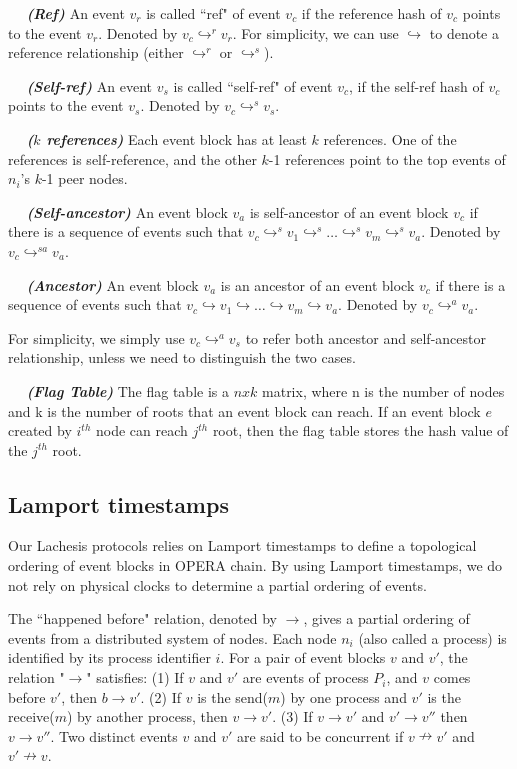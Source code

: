 \documentclass{article}
\newcommand{\dfnn}[2]{$\quad$ \textbf{\emph{(#1)}} {#2}}
\newcommand{\eself}{\hookrightarrow^{s}}
\newcommand{\eref}{\hookrightarrow^{r}}
\newcommand{\eancestor}{\hookrightarrow^{a}}
\newcommand{\eselfancestor}{\hookrightarrow^{sa}}
\newcommand{\erefz}{\hookrightarrow}
\begin{document}
\dfnn{Ref}{An event $v_r$ is called ``ref" of event $v_c$ if the reference hash of $v_c$ points to the event $v_r$. Denoted by $v_c \eref v_r$. For simplicity, we can use $\erefz$ to denote a reference relationship (either $\eref$ or $\eself$).}

\dfnn{Self-ref}{An event $v_s$ is called ``self-ref" of event $v_c$, if the self-ref hash of $v_c$ points to the event $v_s$. Denoted by $v_c \eself v_s$.}

\dfnn{$k$ references}{Each event block has at least $k$ references. One of the references is self-reference, and the other $k$-1 references point to the top events of $n_i$'s $k$-1 peer nodes.}

\dfnn{Self-ancestor}{An event block $v_a$ is self-ancestor of an event block $v_c$ if there is a sequence of events such that $v_c \eself v_1 \eself \dots \eself v_m \eself v_a $. Denoted by $v_c \eselfancestor v_a$.}

\dfnn{Ancestor}{An event block $v_a$ is an ancestor of an event block $v_c$ if there is a sequence of events such that $v_c \erefz v_1 \erefz \dots \erefz v_m \erefz v_a $. Denoted by $v_c \eancestor v_a$.}

For simplicity, we simply use $v_c \eancestor v_s$ to refer both ancestor and self-ancestor relationship, unless we need to distinguish the two cases.

\dfnn{Flag Table}{The flag table is a $n x k$ matrix, where n is the number of nodes and k is the number of roots that an event block can reach. If an event block $e$ created by $i^{th}$ node can reach $j^{th}$ root, then the flag table stores the hash value of the $j^{th}$ root.}

\subsection{Lamport timestamps}

Our Lachesis protocols relies on Lamport timestamps to define a topological ordering of event blocks in OPERA chain.  
By using Lamport timestamps, we do not rely on physical clocks to determine a partial ordering of events.

The ``happened before" relation, denoted by $\rightarrow$, gives a partial ordering of events from a distributed system of nodes. 
Each node $n_i$ (also called a process) is identified by its process identifier $i$. 
For a pair of event blocks $v$ and $v'$, the relation "$\rightarrow$" satisfies: (1) If $v$ and $v'$ are events of process $P_i$, and $v$ comes before $v'$, then $b \rightarrow v'$. (2) If $v$ is the send($m$) by one process and $v'$ is the receive($m$) by another process, then $v \rightarrow v'$. (3) If $v \rightarrow v'$ and $v' \rightarrow v''$ then $v \rightarrow v''$. 
Two distinct events $v$ and $v'$ are said to be concurrent if $v \nrightarrow v'$ and $v' \nrightarrow v$.
\end{document}
